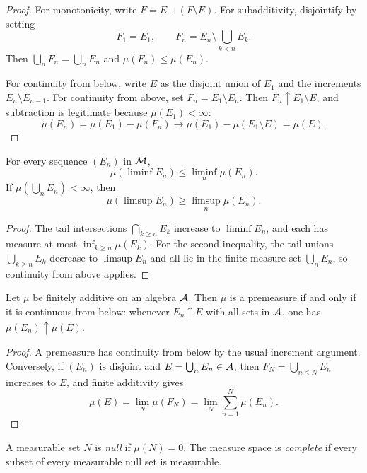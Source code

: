 \begin{proof}
For monotonicity, write $F=E\sqcup(F\setminus E)$. For subadditivity, disjointify by setting
\[
F_1=E_1,\qquad F_n=E_n\setminus\bigcup_{k<n}E_k.
\]
Then $\bigcup_nF_n=\bigcup_nE_n$ and $\mu(F_n)\leq\mu(E_n)$.

For continuity from below, write $E$ as the disjoint union of $E_1$ and the increments $E_n\setminus E_{n-1}$. For continuity from above, set $F_n=E_1\setminus E_n$. Then $F_n\uparrow E_1\setminus E$, and subtraction is legitimate because $\mu(E_1)<\infty$:
\[
\mu(E_n)=\mu(E_1)-\mu(F_n)\longrightarrow
\mu(E_1)-\mu(E_1\setminus E)=\mu(E).
\]
\end{proof}

\begin{cor}
For every sequence $(E_n)$ in $\mathcal{M}$,
\[
\mu(\liminf E_n)\leq\liminf_n\mu(E_n).
\]
If $\mu(\bigcup_nE_n)<\infty$, then
\[
\mu(\limsup E_n)\geq\limsup_n\mu(E_n).
\]
\end{cor}

\begin{proof}
The tail intersections $\bigcap_{k\geq n}E_k$ increase to $\liminf E_n$, and each has measure at most $\inf_{k\geq n}\mu(E_k)$. For the second inequality, the tail unions $\bigcup_{k\geq n}E_k$ decrease to $\limsup E_n$ and all lie in the finite-measure set $\bigcup_nE_n$, so continuity from above applies.
\end{proof}

\begin{prop}
Let $\mu$ be finitely additive on an algebra $\mathcal{A}$. Then $\mu$ is a premeasure if and only if it is continuous from below: whenever $E_n\uparrow E$ with all sets in $\mathcal{A}$, one has $\mu(E_n)\uparrow\mu(E)$.
\end{prop}

\begin{proof}
A premeasure has continuity from below by the usual increment argument. Conversely, if $(E_n)$ is disjoint and $E=\bigcup_nE_n\in\mathcal{A}$, then $F_N=\bigcup_{n\leq N}E_n$ increases to $E$, and finite additivity gives
\[
\mu(E)=\lim_N\mu(F_N)=\lim_N\sum_{n=1}^N\mu(E_n).
\]
\end{proof}

\begin{de}
A measurable set $N$ is \emph{null} if $\mu(N)=0$. The measure space is \emph{complete} if every subset of every measurable null set is measurable.
\end{de}

